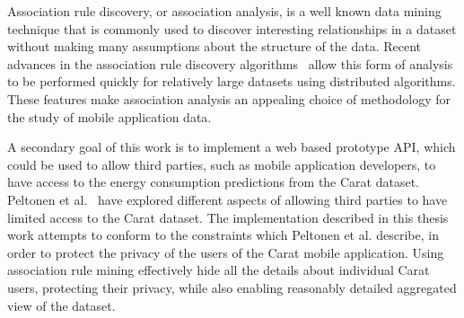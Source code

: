 Association rule discovery, or association analysis, is a well known data mining technique that is commonly used to discover interesting relationships in a dataset without making many assumptions about the structure of the data. Recent advances in the association rule discovery algorithms~\cite{Han:2000:MFP:335191.335372, Li:2008:PPF:1454008.1454027} allow this form of analysis to be performed quickly for relatively large datasets using distributed algorithms. These features make association analysis an appealing choice of methodology for the study of mobile application data.  

A secondary goal of this work is to implement a web based prototype API, which could be used to allow third parties, such as mobile application developers, to have access to the energy consumption predictions from the Carat dataset. Peltonen et al.~\cite{7840871} have explored different aspects of allowing third parties to have limited access to the Carat dataset. The implementation described in this thesis work attempts to conform to the constraints which Peltonen et al. describe, in order to protect the privacy of the users of the Carat mobile application. Using association rule mining effectively hide all the details about individual Carat users, protecting their privacy, while also enabling reasonably detailed aggregated view of the dataset.       



